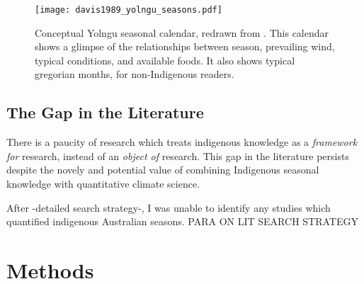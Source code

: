 

\begin{figure}[h]
    \centering
    \texttt{[image: davis1989\_yolngu\_seasons.pdf]}
    \caption[Conceptual Yolngu seasonal calendar \citep{davis1989}]{
        Conceptual Yolngu seasonal calendar, redrawn from \citet[p2]{davis1989}.
        This calendar shows a glimpse of the relationships between season,
        prevailing wind, typical conditions, and available foods.
        It also shows typical gregorian months, for non-Indigenous readers.
        }
    \label{fig:yolngu-seasons}
\end{figure}




\subsection{The Gap in the Literature}

There is a paucity of research which treats indigenous knowledge
as a \emph{framework for} research, instead of an \emph{object of} research.
This gap in the literature persists despite the novely and potential value
of combining Indigenous seasonal knowledge with quantitative climate science.

After -detailed search strategy-, I was unable to identify any studies which
quantified indigenous Australian seasons.  PARA ON LIT SEARCH STRATEGY




\section{Methods}
\label{sec:lit-methods}


